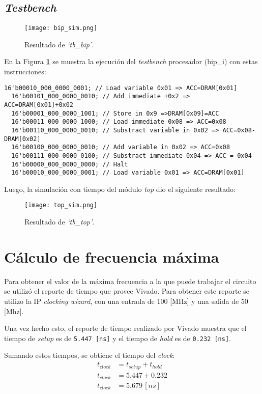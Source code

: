 \documentclass[12pt,a4paper]{article}
\begin{document}
\subsection{\emph{Testbench}}
\label{subs:tb}

\begin{figure}[H]
	\centering
	\texttt{[image: bip\_sim.png]}
	\caption{Resultado de \emph{`tb\_bip'}.}
	\label{fig:bip}
\end{figure}

En la Figura \textbf{\ref{fig:bip}} se muestra la ejecución del \emph{testbench} procesador (bip\_i) con estas instrucciones:

\begin{lstlisting}[language=ve]
  16'b00010_000_0000_0001; // Load variable 0x01 => ACC=DRAM[0x01]
  16'b00101_000_0000_0010; // Add immediate +0x2 => ACC=DRAM[0x01]+0x02
  16'b00001_000_0000_1001; // Store in 0x9 =>DRAM[0x09]=ACC
  16'b00011_000_0000_1000; // Load immediate 0x08 => ACC=0x08
  16'b00110_000_0000_0010; // Substract variable in 0x02 => ACC=0x08-DRAM[0x02]
  16'b00100_000_0000_0010; // Add variable in 0x02 => ACC=0x08
  16'b00111_000_0000_0100; // Substract immediate 0x04 => ACC = 0x04
  16'b00000_000_0000_0000; // Halt
  16'b00010_000_0000_0001; // Load variable 0x01 => ACC=DRAM[0x01]
\end{lstlisting}

Luego, la simulación con tiempo del módulo \emph{top} dio el siguiente resultado:

\begin{figure}[H]
	\centering
	\texttt{[image: top\_sim.png]}
	\caption{Resultado de \emph{`tb\_top'}.}
	\label{fig:top}
\end{figure}


\section{Cálculo de frecuencia máxima}
\label{sec:freq}

Para obtener el valor de la máxima frecuencia a la que puede trabajar el
circuito se utilizó el reporte de tiempo que provee Vivado. Para obtener este reporte se utilizo la IP \emph{clocking wizard}, con una entrada de 100 [MHz] y una salida de 50 [Mhz].

Una vez hecho esto, el reporte de tiempo realizado por Vivado muestra 
que el tiempo de \emph{setup} es de \verb|5.447 [ns]| y el tiempo de \emph{hold} es de \verb|0.232 [ns]|.

Sumando estos tiempos, se obtiene el tiempo del \emph{clock}:
\begin{align*}
	t_{clock} &= t_{setup} + t_{hold} \\
	t_{clock} &= 5.447 + 0.232 \\
	t_{clock} &= 5.679\,[ns]
\end{align*}
\end{document}

